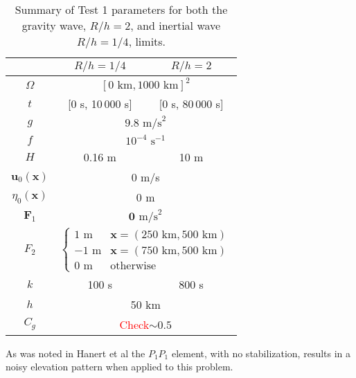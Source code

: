   \def\arraystretch{1.25} %
  \begin{table}[H]
    \begin{center}
      \begin{tabular}{|c|c|c|}
        \hline
        & $R/h = 1/4$ & $R/h = 2$ \\[0.1em] \hline
        $\Omega$ & \multicolumn{2}{c|}{$[0\text{ km}, 1000\text{ km}]^2$} \\ \hline
        $t$ & [0 s, 10\,000 s] & [0 s, 80\,000 s] \\ \hline
        $g$ & \multicolumn{2}{c|}{$9.8\text{ m/s}^2$} \\ \hline 
        $f$ & \multicolumn{2}{c|}{$10^{-4}\text{ s}^{-1}$} \\ \hline
        $H$ & 0.16 m & 10 m \\ \hline
        $\mathbf{u}_0(\mathbf{x})$ & \multicolumn{2}{c|}{0 m/s} \\ \hline
        $\eta_0(\mathbf{x})$ & \multicolumn{2}{c|}{0 m} \\ \hline
        $\mathbf{F}_1$ & \multicolumn{2}{c|}{ $\mathbf{0}\text{ m/s}^2$} \\ \hline
        $F_2$ & \multicolumn{2}{c|}{$
          \begin{cases} 
            1\text{ m} & \mathbf{x} = (250\text{ km}, 500\text{ km}) \\
            -1\text{ m} & \mathbf{x} = (750\text{ km}, 500\text{ km}) \\
            0\text{ m} & \text{otherwise}
          \end{cases}$} \\ \hline
        $k$ & 100 s & 800 s \\ \hline
        $h$ & \multicolumn{2}{c|}{50 km} \\ \hline
        $C_g$ & \multicolumn{2}{c|}{\textcolor{red}{Check}$\sim 0.5$} \\ \hline
      \end{tabular}
      \caption{Summary of Test 1 parameters for both the gravity wave, $R/h =
      2$, and inertial wave $R/h = 1/4$, limits.}
      \label{tab:HFElevationParams}
    \end{center}
  \end{table}

  As was noted in Hanert et al \cite{Hanert2002} the $P_1P_1$ element, with no
  stabilization, results in a noisy elevation pattern when applied to this
  problem. %

